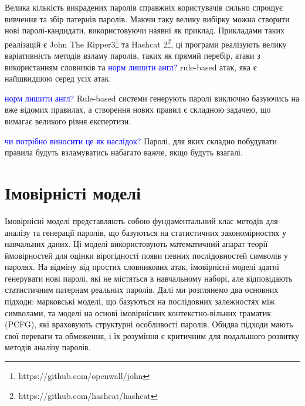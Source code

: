 Велика кількість викрадених паролів справжніх користувачів сильно спрощує вивчення та збір патернів паролів. Маючи таку велику вибірку можна створити нові паролі-кандидати, використовуючи наявні як приклад. Прикладами таких реалізацій є John The Ripper3\footnote{https://github.com/openwall/john} та Hashcat 2\footnote{https://github.com/hashcat/hashcat}, ці програми реалізують велику варіативність методів взламу паролів, таких як прямий перебір, атаки з використанням словників та \textcolor{blue}{норм лишити англ?} rule-based атак, яка є найшвидшою серед усіх атак. 

\begin{remark}
\textcolor{blue}{норм лишити англ?} Rule-based системи генерують паролі виключно базуючись на вже відомих правилах, а створення нових правил є складною задачею, що вимагає великого рівня експертизи. 
\end{remark}

\begin{corollary}
\textcolor{blue}{чи потрібно виносити це як наслідок?} Паролі, для яких складно побудувати правила будуть взламуватись набагато важче, якщо будуть взагалі.
\end{corollary}

\section{Імовірністі моделі}
Імовірнісні моделі представляють собою фундаментальний клас методів для аналізу та генерації паролів, що базуються на статистичних закономірностях у навчальних даних. Ці моделі використовують математичний апарат теорії ймовірностей для оцінки вірогідності появи певних послідовностей символів у паролях. На відміну від простих словникових атак, імовірнісні моделі здатні генерувати нові паролі, які не містяться в навчальному наборі, але відповідають статистичним патернам реальних паролів. Далі ми розглянемо два основних підходи: марковські моделі, що базуються на послідовних залежностях між символами, та моделі на основі імовірнісних контекстно-вільних граматик (PCFG), які враховують структурні особливості паролів. Обидва підходи мають свої переваги та обмеження, і їх розуміння є критичним для подальшого розвитку методів аналізу паролів.


